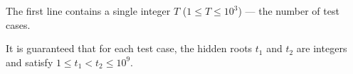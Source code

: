 The first line contains a single integer $T$ ($1 \le T \le 10^3$) --- the number of test cases. 

It is guaranteed that for each test case, the hidden roots $t_1$ and $t_2$ are integers and satisfy $1 \le t_1 < t_2 \le 10^9$.